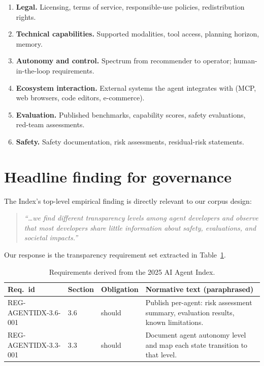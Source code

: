 \documentclass[11pt,a4paper,twoside]{report}
\begin{document}
\begin{enumerate}
\item \textbf{Legal.} Licensing, terms of service, responsible-use
policies, redistribution rights.
\item \textbf{Technical capabilities.} Supported modalities, tool
access, planning horizon, memory.
\item \textbf{Autonomy and control.} Spectrum from recommender to
operator; human-in-the-loop requirements.
\item \textbf{Ecosystem interaction.} External systems the agent
integrates with (MCP, web browsers, code editors, e-commerce).
\item \textbf{Evaluation.} Published benchmarks, capability scores,
safety evaluations, red-team assessments.
\item \textbf{Safety.} Safety documentation, risk assessments,
residual-risk statements.
\end{enumerate}

\section{Headline finding for governance}

The Index's top-level empirical finding is directly relevant to our
corpus design:

\begin{quote}\small
\emph{``\ldots we find different transparency levels among agent developers
and observe that most developers share little information about safety,
evaluations, and societal impacts.''}
\end{quote}

Our response is the transparency requirement set extracted in Table~\ref{tab:agentidx-reqs}.

\begin{table}[h]
\centering
\small
\begin{tabularx}{\textwidth}{p{3.2cm}p{1.4cm}p{1.6cm}X}
\toprule
\textbf{Req.\ id} & \textbf{Section} & \textbf{Obligation} & \textbf{Normative text (paraphrased)} \\
\midrule
REG-AGENTIDX-3.6-001 & 3.6 & should & Publish per-agent: risk assessment summary, evaluation results, known limitations. \\
REG-AGENTIDX-3.3-001 & 3.3 & should & Document agent autonomy level and map each state transition to that level. \\
\bottomrule
\end{tabularx}
\caption{Requirements derived from the 2025 AI Agent Index.}
\label{tab:agentidx-reqs}
\end{table}
\end{document}
